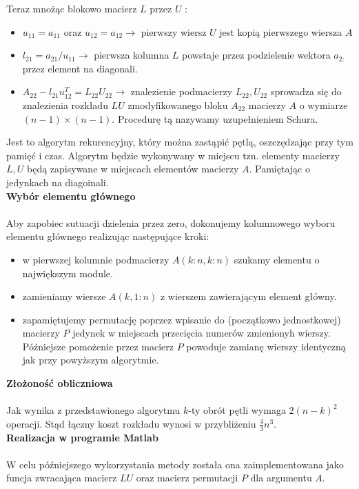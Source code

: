 \documentclass[a4paper, 11pt]{article}
\begin{document}
Teraz mnożąc blokowo macierz $L$ przez $U$ :
\begin{itemize}
\item $u_{11} = a_{11}$ oraz $u_{12} = a_{12} \to $ pierwszy wiersz $U$ jest kopią pierwszego wiersza $A$
\item $l_{21} = a_{21}/u_{11} \to$ pierwsza kolumna $L$ powstaje przez podzielenie wektora $a_{2:}$ przez element na diagonali.
\item $A_{22} - l_{21}u_{12}^T = L_{22}U_{22} \to$ znalezienie podmacierzy $L_{22} , U_{22}$ sprowadza się do znalezienia rozkładu $LU$ zmodyfikowanego bloku $A_{22}$ macierzy $A$ o wymiarze $(n-1)\times(n-1)$. Procedurę tą nazywamy uzupełnieniem Schura.
\end{itemize}

Jest to algorytm rekurencyjny, który można zastąpić pętlą, oszczędzając przy tym pamięć i czas. Algorytm będzie wykonywany w miejscu tzn. elementy macierzy $L,U$ będą zapisywane w miejscach elementów macierzy $A$. Pamiętając o jedynkach na diagoinali.\\


\textbf{Wybór elementu głównego}\\
\\
Aby zapobiec sutuacji dzielenia przez zero, dokonujemy kolumnowego wyboru elementu głównego realizując następujące kroki:
\begin{itemize}
\item w pierwszej kolumnie podmacierzy $A(k:n,k:n)$ szukamy elementu o największym module. 
\item zamieniamy wiersze $A(k,1:n)$ z wierszem zawierającym element główny.
\item zapamiętujemy permutację poprzez wpisanie do (początkowo jednostkowej) macierzy $P$ jedynek w miejscach przecięcia numerów zmienionyh wierszy. Późniejsze pomożenie przez macierz $P$ powoduje zamianę wierszy identyczną jak przy powyższym algorytmie.~\cite{fourth}
\end{itemize}

\textbf{Złożoność obliczniowa}\\
\\
Jak wynika z przedstawionego algorytmu $k$-ty obrót pętli wymaga $2(n-k)^2$ operacji. Stąd łączny koszt rozkładu wynosi w przybliżeniu $\frac{4}{3}n^3$.\\

\textbf{Realizacja w programie Matlab}\\
\\
W celu późniejszego wykorzystania metody została ona zaimplementowana jako funcja zwracająca macierz $LU$ oraz macierz permutacji $P$ dla argumentu $A$.
\end{document}
